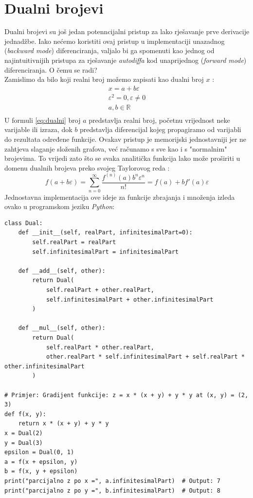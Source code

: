 \documentclass[zavrsnirad]{fer}
\begin{document}
\section{Dualni brojevi}
Dualni brojevi su još jedan potenncijalni pristup za lako rješavanje prve derivacije jednadžbe. Iako nećemo koristiti ovaj pristup u implementaciji unazadnog (\textit{backward mode}) diferenciranja, valjalo bi ga spomenuti kao jednog od najintuitivnijih pristupa za rješavanje \textit{autodiffa} kod unaprijednog (\textit{forward mode}) diferenciranja. O čemu se radi?
\\
Zamislimo da bilo koji realni broj možemo zapisati kao dualni broj $x$ \cite{hoffmann2016hitchhiker}:
\begin{equation}
  \begin{split}
  x = a + b \varepsilon \\
  \varepsilon ^ 2 = 0, \varepsilon \ne 0 \\
  a, b \in \mathbb{R} \\
  \end{split}
  \label{eq:dualni}
\end{equation}
U formuli \ref{eq:dualni} broj $a$ predstavlja realni broj, početnu vrijednost neke varijable ili izraza, dok $b$ predstavlja diferencijal kojeg propagiramo od varijabli do rezultata određene funkcije. Ovakav pristup je memorijski jednostavniji jer ne zahtjeva slaganje složenih grafova, već računamo s sve kao i s "normalnim" brojevima. To vrijedi zato što se svaka analitička funkcija lako može proširiti u domenu dualnih brojeva preko svojeg Taylorovog reda \cite{hoffmann2016hitchhiker}:
\begin{equation}
  f(a + b \varepsilon) = \sum_{n=0}^{\infty} \frac{f^{(n)}(a) b^n \varepsilon^n}{n!} = f(a) + b f'(a) \varepsilon
\end{equation}
Jednostavna implementacija ove ideje za funkcije zbrajanja i množenja izleda ovako u programskom jeziku \textit{Python}:

\lstset{language=python}
\begin{lstlisting}[caption={Primjer korištenja dualnih brojeva za unaprijednu metodu \textit{autodiffa} \cite{wiki:autodiff}}]
class Dual:
    def __init__(self, realPart, infinitesimalPart=0):
        self.realPart = realPart
        self.infinitesimalPart = infinitesimalPart

    def __add__(self, other):
        return Dual(
            self.realPart + other.realPart,
            self.infinitesimalPart + other.infinitesimalPart
        )

    def __mul__(self, other):
        return Dual(
            self.realPart * other.realPart,
            other.realPart * self.infinitesimalPart + self.realPart * other.infinitesimalPart
        )

# Primjer: Gradijent funkcije: z = x * (x + y) + y * y at (x, y) = (2, 3)
def f(x, y):
    return x * (x + y) + y * y
x = Dual(2)
y = Dual(3)
epsilon = Dual(0, 1)
a = f(x + epsilon, y)
b = f(x, y + epsilon)
print("parcijalno z po x =", a.infinitesimalPart)  # Output: 7
print("parcijalno z po y =", b.infinitesimalPart)  # Output: 8
\end{lstlisting}
\end{document}
